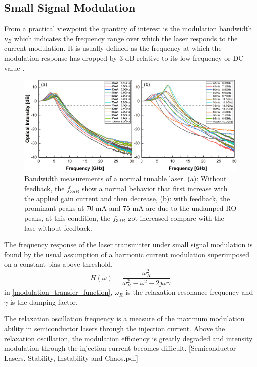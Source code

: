 \subsection{Small Signal Modulation}
From a practical viewpoint the quantity of interest is the modulation bandwidth $\nu_B$ which indicates the frequency range over which the laser responds to the current modulation. It is usually defined as the frequency at which the modulation response has dropped by 3 dB relative to its low-frequency or DC value \cite{agrawal2013semiconductor}.
\begin{figure}[ht]
    \centering
    \includegraphics[width=\linewidth]{figures/bandwidth_gain_scan_cleaved_and_lensed_grating_4679.png}
    \caption{Bandwidth measurements of a normal tunable laser. (a): Without feedback, the $f_{3dB}$ show a normal behavior that first increase with the applied gain current and then decrease, (b): with feedback, the prominant peaks at 70 mA and 75 mA are due to the undamped RO peaks, at this condition, the $f_{3dB}$ got increased compare with the lase without feedback.}
    \label{fig:bandwidth_gain_scan_cleaved_and_lensed}
\end{figure}

The frequency response of the laser transmitter under small signal modulation is found by the usual assumption of a harmonic current modulation superimposed on a constant bias above threshold.
\begin{equation}
    H(\omega)=\frac{\omega_R^2}{\omega_R^2-\omega^2-2j\omega\gamma}
    \label{modulation_transfer_function}
\end{equation}
in \autoref{modulation_transfer_function}, $\omega_R$ is the relaxation resonance frequency and $\gamma$ is the damping factor.

The relaxation oscillation frequency is a measure of the maximum modulation ability in semiconductor lasers through the injection current. Above the relaxation oscillation, the modulation efficiency is greatly degraded and intensity modulation through the injection current becomes difficult. [Semiconductor Lasers. Stability, Instability and Chaos.pdf]

